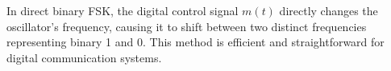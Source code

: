 In direct binary FSK, the digital control signal \( m(t) \) directly changes the oscillator's frequency, causing it to shift between two distinct frequencies representing binary 1 and 0. This method is efficient and straightforward for digital communication systems.

